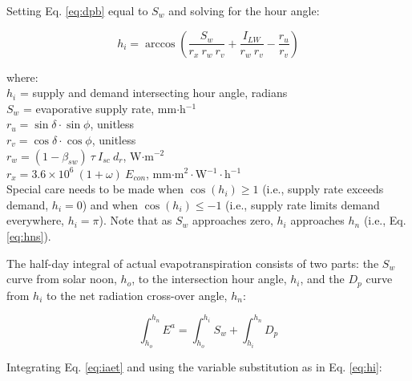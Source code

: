 \noindent Setting Eq. \ref{eq:dpb} equal to $S_w$ and solving for the hour angle:

\begin{equation}
\label{eq:hi}
	h_i = \arccos \left( \frac{S_w}{r_x\: r_w\: r_v}
	                   + \frac{I_{LW}}{r_w\: r_v}
	                   - \frac{r_u}{r_v} \right)
\end{equation}

\noindent where:\\
\indent $h_i$ = supply and demand intersecting hour angle, radians\\
\indent $S_w$ = evaporative supply rate, mm$\cdot$h$^{-1}$\\
\indent $r_u = \sin\delta\cdot\sin\phi$, unitless \\
\indent $r_v = \cos\delta\cdot\cos\phi$, unitless \\
\indent $r_w = \left(1-\beta_{sw}\right)\: \tau\: I_{sc}\: d_r$, W$\cdot$m$^{-2}$\\
\indent $r_x = 3.6\times10^6\: \left(1 + \omega \right)\: E_{con}$, mm$\cdot$m$^{2}\cdot$W$^{-1}\cdot$h$^{-1}$\\

\noindent Special care needs to be made when $\cos\left( h_i\right) \geq 1$ (i.e., supply rate exceeds demand, $h_i = 0$) and when $\cos\left( h_i\right) \leq -1$ (i.e., supply rate limits demand everywhere, $h_i = \pi$). Note that as $S_w$ approaches zero, $h_i$ approaches $h_n$ (i.e., Eq. \ref{eq:hns}).

The half-day integral of actual evapotranspiration consists of two parts: the $S_w$ curve from solar noon, $h_o$, to the intersection hour angle, $h_i$, and the $D_p$ curve from $h_i$ to the net radiation cross-over angle, $h_n$:

\begin{equation}
\label{eq:iaet}
	\int_{h_o}^{h_n} E^a = \int_{h_o}^{h_i} S_w + \int_{h_i}^{h_n} D_p
\end{equation}

Integrating Eq. \ref{eq:iaet} and using the variable substitution as in Eq. \ref{eq:hi}:

